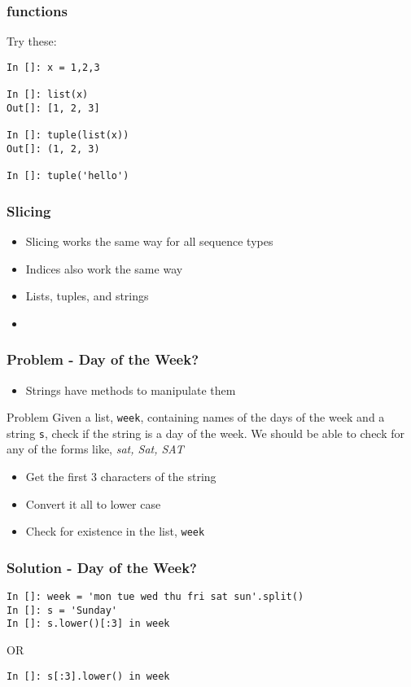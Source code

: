 \documentclass[14pt,compress]{beamer}
\begin{document}
\begin{frame}[fragile]
  \frametitle{ functions}
  Try these:
\begin{lstlisting}
In []: x = 1,2,3

In []: list(x)
Out[]: [1, 2, 3]

In []: tuple(list(x))
Out[]: (1, 2, 3)

In []: tuple('hello')
\end{lstlisting}
\end{frame}

\begin{frame}
  \frametitle{Slicing}
  \begin{itemize}
  \item Slicing works the same way for all sequence types
  \item Indices also work the same way
  \item Lists, tuples, and strings
  \item \alert{}
  \end{itemize}
\end{frame}

\begin{frame}
  \frametitle{Problem - Day of the Week?}
  \begin{itemize}
  \item Strings have methods to manipulate them
  \end{itemize}
  \begin{block}{Problem}
    Given a list, \texttt{week}, containing names of the days of the
    week and a string \texttt{s}, check if the string is a day of the
    week. We should be able to check for any of the forms like,
    \emph{sat, Sat, SAT}
  \end{block}
  \begin{itemize}
  \item Get the first 3 characters of the string
  \item Convert it all to lower case
  \item Check for existence in the list, \texttt{week}
  \end{itemize}
\end{frame}

\begin{frame}[fragile]
  \frametitle{Solution - Day of the Week?}
\begin{lstlisting}
In []: week = 'mon tue wed thu fri sat sun'.split()
In []: s = 'Sunday'
In []: s.lower()[:3] in week
\end{lstlisting}
  OR
\begin{lstlisting}
In []: s[:3].lower() in week
\end{lstlisting}
\end{frame}
\end{document}
